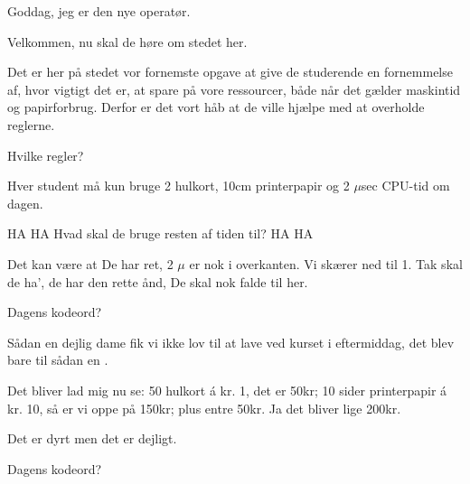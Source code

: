\documentclass[a4paper,11pt]{article}
\begin{document}
\begin{sketch}


   Goddag, jeg er den nye operatør.

   Velkommen, nu skal de høre om stedet her.

   Det er her på stedet vor fornemste opgave at give de
  studerende en fornemmelse af, hvor vigtigt det er, at spare på vore
  ressourcer, både når det gælder maskintid og papirforbrug.  Derfor
  er det vort håb at de ville hjælpe med at overholde reglerne.

   Hvilke regler?

   Hver student må kun bruge 2 hulkort, 10cm printerpapir og
  2 $\mu{}$sec CPU-tid om dagen.

   HA HA Hvad skal de bruge resten af tiden til? HA HA

   Det kan være at De har ret, 2 $\mu{}$ er nok i overkanten.
  Vi skærer ned til 1.  Tak skal de ha', de har den rette ånd, De skal
  nok falde til her.





   Dagens kodeord?


   Sådan en dejlig dame fik vi ikke lov til at lave ved kurset
  i eftermiddag, det blev bare til sådan en .

   Det bliver lad mig nu se: 50 hulkort á kr. 1, det er 50kr;
  10 sider printerpapir á kr. 10, så er vi oppe på 150kr; plus entre
  50kr.  Ja det bliver lige 200kr.

   Det er dyrt men det er dejligt.


   Dagens kodeord?


\end{sketch}
\end{document}
